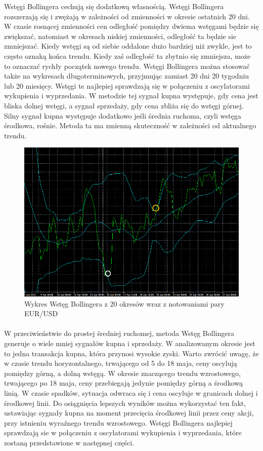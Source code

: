 \documentclass[pdflatex,11pt]{aghdpl}
\begin{document}
Wstęgi Bollingera cechują się dodatkową własnością. Wstęgi Bollingera rozszerzają się i zwężają w zależności od zmienności w okresie ostatnich 20 dni. W czasie rosnącej zmienności cen odległość pomiędzy dwiema wstęgami będzie się zwiększać, natomiast w okresach niskiej zmienności, odległość ta będzie sie zmniejszać. Kiedy wstęgi są od siebie oddalone dużo bardziej niż zwykle, jest to często oznaką końca trendu. Kiedy zaś odległość ta zbytnio się zmniejsza, może to oznaczać rychły początek nowego trendu\cite{5}. Wstęgi Bollingera można stosować także na wykresach długoterminowych, przyjmując zamiast 20 dni 20 tygodniu lub 20 miesięcy. Wstęgi te najlepiej sprawdzają się w połączeniu z oscylatorami wykupienia i wyprzedania. W metodzie tej sygnał kupna występuje, gdy cena jest bliska dolnej wstęgi, a sygnał sprzedaży, gdy cena zbliża się do wstęgi górnej. Silny sygnał kupna występuje dodatkowo jeśli średnia ruchoma, czyli wstęga środkowa, rośnie. Metoda ta ma zmienną skuteczność w zależności od aktualnego trendu.
\begin{figure}[ht]
\begin{center}
\includegraphics[width=15cm]{bb.png}
\caption{Wykres Wstęg Bollingera z 20 okresów wraz z notowaniami pary EUR/USD}
\label{bb}
\end{center}
\end{figure}
\paragraph{}
W przeciwieństwie do prostej średniej ruchomej, metoda Wstęg Bollingera generuje o wiele mniej sygnałów kupna i sprzedaży. W analizowanym okresie jest to jedna transakcja kupna, która przynosi wysokie zyski. Warto zwrócić uwagę, że w czasie trendu horyzontalnego, trwającego od 5 do 18 maja, ceny oscylują pomiędzy górną, a dolną wstęgą. W okresie znaczącego trendu wzrostowego, trwającego po 18 maja, ceny przebiegają jedynie pomiędzy górną a środkową linią. W czasie spadków, sytuacja odwraca się i cena oscyluje w granicach dolnej i środkowej linii. Do osiągnięcia lepszych wyników można wykorzystać ten fakt, ustawiając sygnały kupna na moment przecięcia środkowej linii przez ceny akcji, przy istnieniu wyraźnego trendu wzrostowego. Wstęgi Bollingera najlepiej sprawdzają sie w połączeniu z oscylatorami wykupienia i wyprzedania, które zostaną przedstawione w następnej części.
\end{document}
